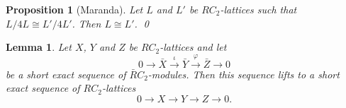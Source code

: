\documentclass[11pt, a4paper]{amsart}
\newtheorem{lemma}[theorem]{Lemma}
\newtheorem{proposition}[theorem]{Proposition}
\theoremstyle{definition}
\theoremstyle{definition}
\begin{document}
\begin{proposition}[Maranda]\label{prop maranda}
    Let $L$ and $L'$ be $RC_2$-lattices such that $L/4L\cong L'/4L'$. Then $L\cong L'$. \qed
\end{proposition}

\begin{lemma}\label{lemma ses lifts}
    Let $X$, $Y$ and $Z$ be $RC_2$-lattices and let
    \begin{equation}\label{ses over bar r}
        0\longrightarrow \bar X \stackrel{\iota}{\longrightarrow} \bar Y \stackrel{\varphi}{\longrightarrow} \bar Z \longrightarrow 0
    \end{equation}
    be a short exact sequence of $\bar R C_2$-modules. Then this sequence lifts to a short exact sequence of $RC_2$-lattices
    \begin{equation}
        0\longrightarrow X \longrightarrow Y \longrightarrow Z \longrightarrow 0.
    \end{equation}
\end{lemma}
\end{document}
